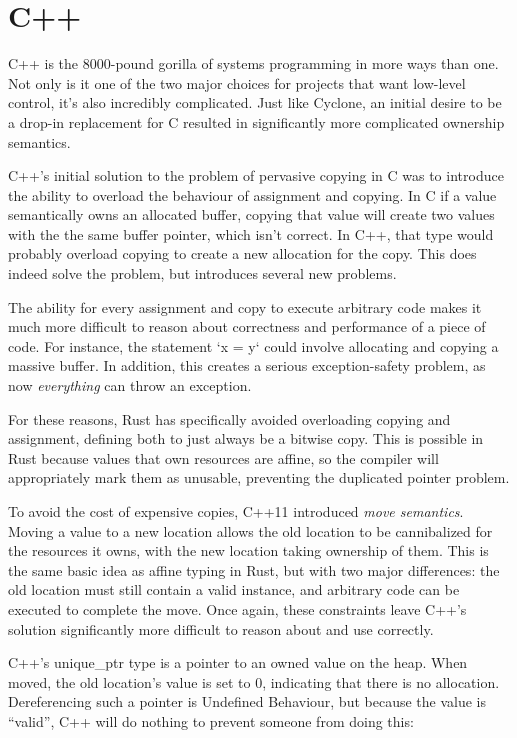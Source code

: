\section{C++}

C++ is the 8000-pound gorilla of systems programming in more ways than one. Not
only is it one of the two major choices for projects that want low-level control,
it's also incredibly complicated. Just like Cyclone, an initial
desire to be a drop-in replacement for C resulted in significantly more complicated
ownership semantics.

C++'s initial solution to the problem of pervasive copying in C was to introduce
the ability to overload the behaviour of assignment and copying. In C if a value
semantically owns an allocated buffer, copying that value will create two values
with the the same buffer pointer, which isn't correct. In C++, that type would
probably overload copying to create a new allocation for the copy. This does
indeed solve the problem, but introduces several new problems.

The ability for every assignment and copy to execute arbitrary code makes it
much more difficult to reason about correctness and performance of a piece of
code. For instance, the statement `x = y` could involve allocating and copying
a massive buffer. In addition, this creates a serious exception-safety problem,
as now \emph{everything} can throw an exception.

For these reasons, Rust has specifically avoided overloading copying and assignment,
defining both to just always be a bitwise copy. This is possible in Rust because values
that own resources are affine, so the compiler will appropriately mark them
as unusable, preventing the duplicated pointer problem.

To avoid the cost of expensive copies, C++11 introduced \emph{move semantics}.
Moving a value to a new location allows the old location to be cannibalized for
the resources it owns, with the new location taking ownership of them. This is
the same basic idea as affine typing in Rust, but with two major differences: the
old location must still contain a valid instance, and arbitrary code can be
executed to complete the move. Once again, these constraints leave C++'s solution
significantly more difficult to reason about and use correctly.

C++'s unique\_ptr type is a pointer to an owned value on the heap. When moved,
the old location's value is set to 0, indicating that there is no allocation.
Dereferencing such a pointer is Undefined Behaviour, but because the value is
``valid'', C++ will do nothing to prevent someone from doing this:

